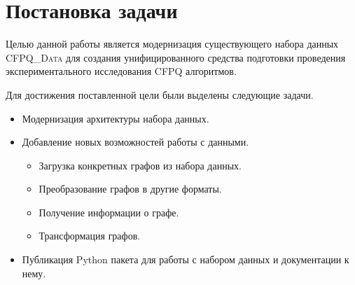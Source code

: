 \section{Постановка задачи}

Целью данной работы является модернизация существующего набора данных \textsc{CFPQ\_Data} для создания унифицированного средства подготовки проведения экспериментального исследования CFPQ алгоритмов.

Для достижения поставленной цели были выделены следующие задачи.
\begin{itemize}
	\item Модернизация архитектуры набора данных.
	\item Добавление новых возможностей работы с данными.
	      \begin{itemize}
	      	\item Загрузка конкретных графов из набора данных.
	      	\item Преобразование графов в другие форматы.
	      	\item Получение информации о графе.
	      	\item Трансформация графов.
	      \end{itemize}
	\item Публикация Python пакета для работы с набором данных и документации к нему.
\end{itemize}
